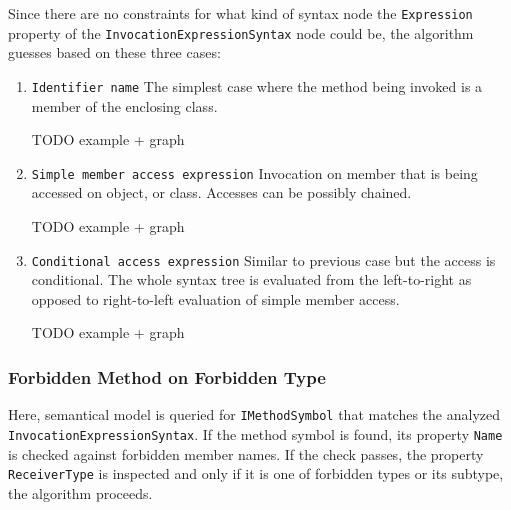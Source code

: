 \documentclass[
  digital, %
  table,   %
  lof,     %
  lot,     %
  oneside,
]{fithesis3}
\begin{document}
Since there are no constraints for what kind of syntax node the \texttt{Expression} property of the \texttt{InvocationExpressionSyntax} node could be, the algorithm guesses based on these three cases:
\begin{enumerate}
  \item \texttt{Identifier name}
  The simplest case where the method being invoked is a member of the enclosing class.

  TODO example + graph
  
  \item \texttt{Simple member access expression}
  Invocation on member that is being accessed on object, or class. Accesses can be possibly chained.
  
  TODO example + graph
    
  \item \texttt{Conditional access expression}
  Similar to previous case but the access is conditional. The whole syntax tree is evaluated from the left-to-right as opposed to right-to-left evaluation of simple member access.  
  
  TODO example + graph
  
\end{enumerate} 


\subsubsection{Forbidden Method on Forbidden Type}
Here, semantical model is queried for \texttt{IMethodSymbol} that matches the analyzed \texttt{InvocationExpressionSyntax}. If the method symbol is found, its property \texttt{Name} is checked against forbidden member names. If the check passes, the property \texttt{ReceiverType} is inspected and only if it is one of forbidden types or its subtype, the algorithm proceeds. 
\end{document}
